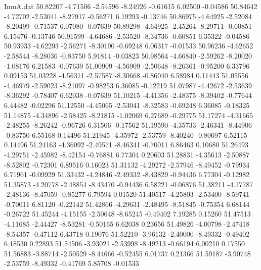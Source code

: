 \begin{filecontents}{ImuA.dat}
  50.82207   -4.71506   -2.54596   -8.24926   -0.61615    6.02500   -0.04586
  50.84642   -4.72702   -2.53041   -8.27917   -0.56271    6.19293   -0.13746
  50.86975   -4.64925   -2.52084   -8.20499   -0.71537    6.07080   -0.07639
  50.89298   -4.64925   -2.45264   -8.29711   -0.60851    6.15476   -0.13746
  50.91599   -4.64686   -2.53520   -8.34736   -0.60851    6.35322   -0.04586
  50.93933   -4.62293   -2.56271   -8.30190   -0.69248    6.06317   -0.01533
  50.96236   -4.62652   -2.58544   -8.28036   -0.83750    5.91814   -0.03823
  50.98564   -4.66840   -2.59262   -8.20020   -1.08176    6.21583   -0.07639
  51.00909   -4.56909   -2.50648   -8.26361   -0.95200    6.33796    0.09153
  51.03228   -4.56311   -2.57587   -8.30668   -0.86040    6.58984    0.11443
  51.05556   -4.46979   -2.59023   -8.21097   -0.98253    6.36085   -0.12219
  51.07987   -4.42672   -2.53639   -8.36292   -0.78407    6.62038   -0.07639
  51.10215   -4.41356   -2.48375   -8.39402   -0.77644    6.44482   -0.02296
  51.12550   -4.45065   -2.53041   -8.32583   -0.69248    6.36085   -0.18325
  51.14875   -4.34896   -2.58425   -8.21815   -1.02069    6.27689   -0.29775
  51.17274   -4.31665   -2.48255   -8.26242   -0.96726    6.31506   -0.17562
  51.19590   -4.35733   -2.46341   -8.44906   -0.83750    6.55168    0.14496
  51.21945   -4.35972   -2.53759   -8.40240   -0.80697    6.52115    0.14496
  51.24163   -4.36092   -2.49571   -8.46341   -0.70011    6.86463    0.10680
  51.26493   -4.29751   -2.45982   -8.42154   -0.76881    6.77304    0.20603
  51.28831   -4.35613   -2.50887   -8.52802   -0.72301    6.89516    0.16023
  51.31132   -4.29272   -2.57946   -8.49452   -0.79934    6.71961   -0.09929
  51.33432   -4.24846   -2.49332   -8.43829   -0.94436    6.77304   -0.12982
  51.35873   -4.20778   -2.48854   -8.43470   -0.94436    6.58221   -0.06876
  51.38211   -4.17787   -2.48136   -8.47059   -0.85277    6.79594    0.01520
  51.40517   -4.25803   -2.53400   -8.59741   -0.70011    6.81120   -0.22142
  51.42866   -4.29631   -2.48495   -8.51845   -0.75354    6.68144   -0.26722
  51.45244   -4.15155   -2.50648   -8.65245   -0.49402    7.19285    0.15260
  51.47513   -4.11685   -2.44427   -8.53281   -0.50165    6.62038    0.23656
  51.49826   -4.00798   -2.47418   -8.54357   -0.47112    6.43718    0.19076
  51.52210   -3.96132   -2.40000   -8.49332   -0.49402    6.18530    0.22893
  51.54506   -3.93021   -2.53998   -8.49213   -0.66194    6.00210    0.17550
  51.56883   -3.88714   -2.50529   -8.44666   -0.52455    6.01737    0.21366
  51.59187   -3.90748   -2.53759   -8.49332   -0.41769    5.85708   -0.01533

\end{filecontents}
